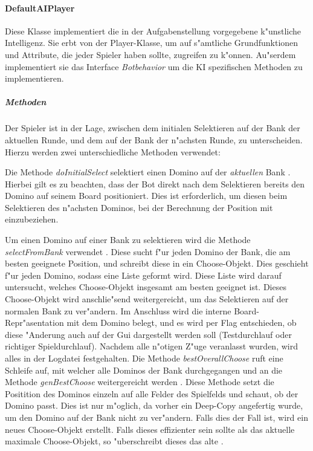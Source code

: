 \paragraph{DefaultAIPlayer}
\label{par:defaultAIPlayer}
Diese Klasse implementiert die in der Aufgabenstellung vorgegebene k"unstliche Intelligenz. Sie erbt von der Player-Klasse, um auf s"amtliche Grundfunktionen und Attribute, die jeder Spieler haben sollte, zugreifen zu k"onnen. Au"serdem implementiert sie das Interface \emph{Botbehavior} um die KI spezifischen Methoden zu implementieren. 

\subparagraph{Methoden}
Der Spieler ist in der Lage, zwischen dem initialen Selektieren auf der Bank der aktuellen Runde, und dem auf der Bank der n"achsten Runde, zu unterscheiden. Hierzu werden zwei unterschiedliche Methoden verwendet: 

Die Methode \emph{doInitialSelect} selektiert einen Domino auf der \emph{aktuellen} Bank . Hierbei gilt es zu beachten, dass der Bot direkt nach dem Selektieren bereits den Domino auf seinem Board positioniert. Dies ist erforderlich, um diesen beim Selektieren des n"achsten Dominos, bei der Berechnung der Position mit einzubeziehen. 

Um einen Domino auf einer Bank zu selektieren wird die Methode \emph{selectFromBank} verwendet . Diese sucht f"ur jeden Domino der Bank, die am besten geeignete Position, und schreibt diese in ein Choose-Objekt. Dies geschieht f"ur jeden Domino, sodass eine Liste geformt wird. Diese Liste wird darauf untersucht, welches Choose-Objekt insgesamt am besten geeignet ist. Dieses Choose-Objekt wird anschlie"send weitergereicht, um das Selektieren auf der normalen Bank zu ver"andern. Im Anschluss wird die interne Board-Repr"asentation mit dem Domino belegt, und es wird per Flag entschieden, ob diese "Anderung auch auf der Gui dargestellt werden soll (Testdurchlauf oder richtiger Spieldurchlauf). Nachdem alle n"otigen Z"uge veranlasst wurden, wird alles in der Logdatei festgehalten. Die Methode \emph{bestOverallChoose} ruft eine Schleife auf, mit welcher alle Dominos der Bank durchgegangen und an die Methode \emph{genBestChoose} weitergereicht werden . Diese Methode setzt die Positition des Dominos einzeln auf alle Felder des Spielfelds und schaut, ob der Domino passt. Dies ist nur m"oglich, da vorher ein Deep-Copy angefertig wurde, um den Domino auf der Bank nicht zu ver"andern. Falls dies der Fall ist, wird ein neues Choose-Objekt erstellt. Falls dieses effizienter sein sollte als das aktuelle maximale Choose-Objekt, so "uberschreibt dieses das alte . 

